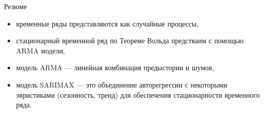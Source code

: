 \begin{frame}{Резюме}
    \begin{itemize}
        \item временные ряды представляются как случайные процессы,
        \item стационарный временной ряд по Теореме Вольда предстваим с помощью ARMA модели,
        \item модель ARMA --- линейная комбинация предыстории и шумов,
        \item модель SARIMAX --- это объединение авторегрессии с некоторыми эвристиками  (сезонность, тренд) для обеспечения стационарности временного ряда.
        
    \end{itemize}
\end{frame}

 